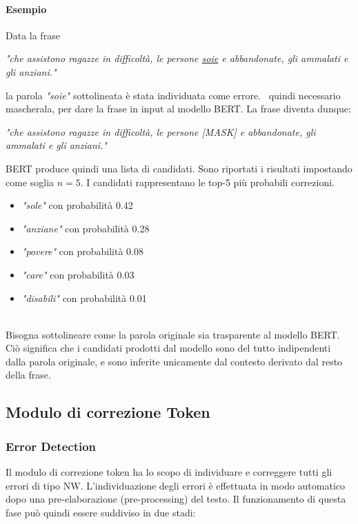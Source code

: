 \paragraph{Esempio} Data la frase 
\begin{center}
\textit{"che assistono ragazze in difficoltà, le persone \underline{soie} e abbandonate, gli ammalati e gli anziani."}
\end{center}
la parola \textit{"soie"} sottolineata è stata individuata come errore. \E\ quindi necessario mascherala, per dare la frase in input al modello BERT. La frase diventa dunque:
\begin{center}
\textit{"che assistono ragazze in difficoltà, le persone [MASK] e abbandonate, gli ammalati e gli anziani."}
\end{center}
BERT produce quindi una lista di candidati. Sono riportati i risultati impostando come soglia $n=5$. I candidati rappresentano le top-5 più probabili correzioni.
\begin{itemize}
\item \textit{"sole"} con probabilità 0.42
\item \textit{"anziane"} con probabilità 0.28
\item \textit{"povere"} con probabilità 0.08
\item \textit{"care"} con probabilità 0.03
\item \textit{"disabili"} con probabilità 0.01
\end{itemize}
\ \\
Bisogna sottolineare come la parola originale sia trasparente al modello BERT. Ciò significa che i candidati prodotti dal modello sono del tutto indipendenti dalla parola originale, e sono inferite unicamente dal contesto derivato dal resto della frase.\\




\subsection{Modulo di correzione Token}
\label{sec:met_tok_correct}

\subsubsection{Error Detection}
\label{sec:met_tok_errdet}
Il modulo di correzione token ha lo scopo di individuare e correggere tutti gli errori di tipo NW.  L'individuazione degli errori è effettuata in modo automatico dopo
una pre-elaborazione (pre-processing) del testo. Il funzionamento di questa
fase può quindi essere suddiviso in due stadi:


